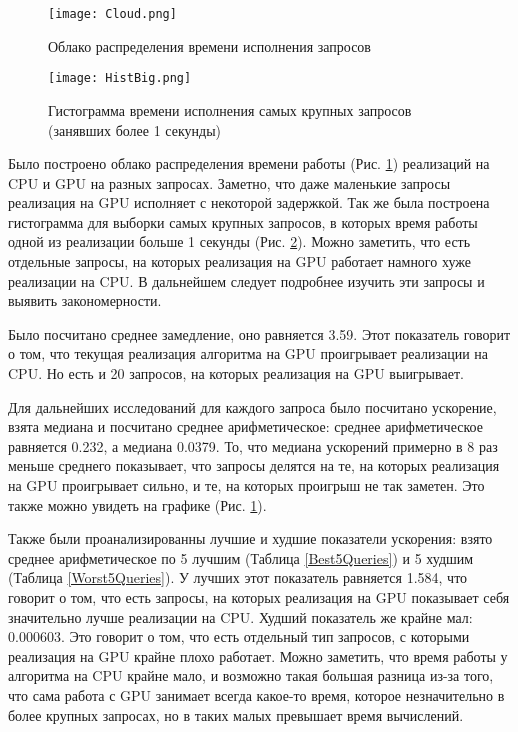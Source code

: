 \begin{figure}[H]
    \centering
    \texttt{[image: Cloud.png]}
    \caption{Облако распределения времени исполнения запросов}
    \label{GraphicFull}
\end{figure}

\begin{figure}[H]
    \centering
    \texttt{[image: HistBig.png]}
    \caption{Гистограмма времени исполнения самых крупных запросов (занявших более 1 секунды)}
    \label{GraphicBig}
\end{figure}

\newpage

Было построено облако распределения времени работы (Рис. \ref{GraphicFull}) реализаций на CPU и GPU на разных запросах. Заметно, что даже маленькие запросы реализация на GPU исполняет с некоторой задержкой. Так же была построена гистограмма для выборки самых крупных запросов, в которых время работы одной из реализации больше 1 секунды (Рис. \ref{GraphicBig}). Можно заметить, что есть отдельные запросы, на которых реализация на GPU работает намного хуже реализации на CPU. В дальнейшем следует подробнее изучить эти запросы и выявить закономерности.

Было посчитано среднее замедление, оно равняется 3.59. Этот показатель говорит о том, что текущая реализация алгоритма на GPU проигрывает реализации на CPU. Но есть и 20 запросов, на которых реализация на GPU выигрывает.

Для дальнейших исследований для каждого запроса было посчитано ускорение, взята медиана и посчитано среднее арифметическое: среднее арифметическое равняется 0.232, а медиана 0.0379. То, что медиана ускорений примерно в 8 раз меньше среднего показывает, что запросы делятся на те, на которых реализация на GPU проигрывает сильно, и те, на которых проигрыш не так заметен. Это также можно увидеть на графике (Рис. \ref{GraphicFull}).

Также были проанализированны лучшие и худшие показатели ускорения: взято среднее арифметическое по 5 лучшим (Таблица \ref{Best5Queries}) и 5 худшим (Таблица \ref{Worst5Queries}). У лучших этот показатель равняется 1.584, что говорит о том, что есть запросы, на которых реализация на GPU показывает себя значительно лучше реализации на CPU. Худший показатель же крайне мал: 0.000603. Это говорит о том, что есть отдельный тип запросов, с которыми реализация на GPU крайне плохо работает. Можно заметить, что время работы у алгоритма на CPU крайне мало, и возможно такая большая разница из-за того, что сама работа с GPU занимает всегда какое-то время, которое незначительно в более крупных запросах, но в таких малых превышает время вычислений.

